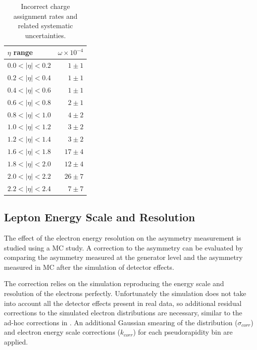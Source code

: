 \begin{table}[htbp]
  \begin{center}
\begin{tabular}{lr}
\toprule
$\eta$ range        & $\omega \times 10^{-4}$    \\
\midrule
$0.0<| \eta |<0.2$  & $ 1 \pm 1 $    \\ 
$0.2<| \eta |<0.4$  & $ 1 \pm 1 $    \\
$0.4<| \eta |<0.6$  & $ 1 \pm 1 $    \\
$0.6<| \eta |<0.8$  & $ 2 \pm 1 $    \\
$0.8<| \eta |<1.0$  & $ 4 \pm 2 $    \\ 
$1.0<| \eta |<1.2$  & $ 3 \pm 2 $    \\
$1.2<| \eta |<1.4$  & $ 3 \pm 2 $    \\
$1.6<| \eta |<1.8$  & $17 \pm 4 $    \\
$1.8<| \eta |<2.0$  & $12 \pm 4 $    \\
$2.0<| \eta |<2.2$  & $26 \pm 7 $    \\
$2.2<| \eta |<2.4$  & $ 7 \pm 7 $    \\
\bottomrule
\end{tabular}
\caption[Incorrect charge assignment rates and related systematic
uncertainties.]{\label{tab:mischarge}Incorrect charge assignment rates and
related systematic uncertainties\cite{bendavid2011electron}.}
\end{center}
\end{table}

\subsection{Lepton Energy Scale and Resolution}
The effect of the electron energy resolution on the asymmetry measurement is
studied using a {MC} study. A correction to the asymmetry can be evaluated by
comparing the asymmetry measured at the generator level and the asymmetry
measured in {MC} after the simulation of detector effects.

The correction relies on the simulation reproducing the energy scale and
resolution of the electrons perfectly. Unfortunately the simulation does not
take into account all the detector effects present in real data, so additional
residual corrections to the simulated electron \pT distributions are necessary,
similar to the ad-hoc corrections in . 
An additional Gaussian smearing of the \pT distribution ($\sigma_{corr}$) and
electron energy scale corrections ($k_{corr}$) for each pseudorapidity bin are
applied\cite{bauer2011higgs}.

